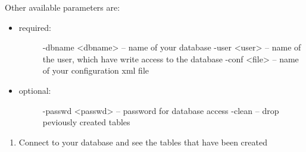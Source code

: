 \documentclass[a4paper,10pt,english]{manual}
\begin{document}
Other available parameters are:
\begin{itemize}
\item {} \begin{description}
\item[required:] \leavevmode{}

-dbname \textless{}dbname\textgreater{}        -- name of your database
-user   \textless{}user\textgreater{}          -- name of the user, which have write access to the database
-conf   \textless{}file\textgreater{}          -- name of your configuration xml file

\end{description}

\item {} \begin{description}
\item[optional:] \leavevmode{}

-passwd \textless{}passwd\textgreater{}        --  password for database access
-clean                          -- drop peviously created tables

\end{description}

\end{itemize}
\begin{enumerate}
\item {} 
Connect to your database and see the tables that have been created

\end{enumerate}
\end{document}
